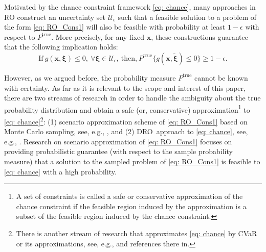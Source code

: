 \documentclass[final,onefignum,onetabnum]{class}
\newcommand{\bs}[1]{\boldsymbol{#1}} %
\newcommand{\Ts}[1]{\mathbbmtt{#1}} %
\newcommand{\Cs}[1]{\mathcal{#1}} %
\newcommand{\txi}{\tilde{\bs{\xi}}}
\newcommand{\trueP}{\Ts{P}^{\text{true}}}
\newcommand{\dro}{DRO}
\begin{document}
Motivated by the chance constraint framework \eqref{eq: chance}, many approaches in RO construct  an uncertainty set $\Cs{U}_{\epsilon}$ such that a feasible solution to a problem of the  form \eqref{eq: RO_Cons1} will  also  be  feasible with  probability  at least $1-\epsilon$ with respect to $P^{\text{true}}$. %
More precisely, for any fixed $\bs{x}$, these constructions guarantee that  the following implication holds: 
\begin{equation}
\label{eq: rev.prob.guarantee}
	\text{If} \  g(\bs{x}, \bs{\xi}) \le 0, \ \forall \bs{\xi} \in \Cs{U}_{\epsilon}, \ \text{then,} \ P^{\text{true}}\{g(\bs{x}, \txi) \le 0 \} \ge 1-\epsilon. \tag{C1}
\end{equation}

However, as we argued before, the probability measure $P^{\text{true}}$ cannot be known with certainty. As far as it is relevant to the scope and interest of this paper, there are two streams of research in order to handle the ambiguity about the true probability distribution and obtain a safe (or, conservative) approximation\footnote{A set of constraints is called a safe or conservative approximation of the chance constraint if the feasible region induced by the approximation is a subset of the feasible region induced by the chance constraint.} to \eqref{eq: chance}\footnote{There is another stream of research that approximates \eqref{eq: chance} by CVaR or its approximations, see, e.g., \citet{chen2007robust,chen2009goal,chen2010joint} and references there in.}:   (1) scenario approximation scheme of \eqref{eq: RO_Cons1} based on Monte Carlo sampling, see, e.g., \citet{campi2004,calafiore2005,nemirovski2006scenario,campi2008,luedtke2008chance,bental2009LMI}, and (2) \dro\ approach to \eqref{eq: chance}, see, e.g., \citet{nemirovski2006convex,erdougan2006}.  
Research on scenario approximation of \eqref{eq: RO_Cons1} focuses on providing probabilistic guarantee (with respect to the sample probability measure) that a solution to the sampled problem of \eqref{eq: RO_Cons1} is feasible to \eqref{eq: chance} with a high probability. %
\end{document}
